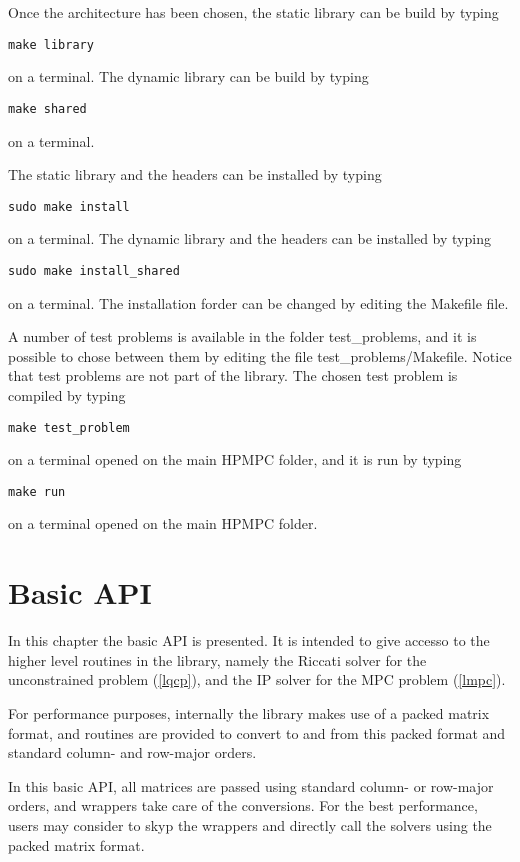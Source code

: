 \documentclass[a4paper]{report}
\begin{document}
Once the architecture has been chosen, the static library can be build by typing
\begin{verbatim}
make library
\end{verbatim}
on a terminal. The dynamic library can be build by typing
\begin{verbatim}
make shared
\end{verbatim}
on a terminal.

The static library and the headers can be installed by typing
\begin{verbatim}
sudo make install
\end{verbatim}
on a terminal. The dynamic library and the headers can be installed by typing
\begin{verbatim}
sudo make install_shared
\end{verbatim}
on a terminal. The installation forder can be changed by editing the Makefile file.

A number of test problems is available in the folder test\_problems, and it is possible to chose between them by editing the file test\_problems/Makefile.
Notice that test problems are not part of the library.
The chosen test problem is compiled by typing
\begin{verbatim}
make test_problem
\end{verbatim}
on a terminal opened on the main HPMPC folder, and it is run by typing
\begin{verbatim}
make run 
\end{verbatim}
on a terminal opened on the main HPMPC folder.


\chapter{Basic API}

In this chapter the basic API is presented. 
It is intended to give accesso to the higher level routines in the library, namely the Riccati solver for the unconstrained problem (\ref{lqcp}), and the IP solver for the MPC problem (\ref{lmpc}).

For performance purposes, internally the library makes use of a packed matrix format, and routines are provided to convert to and from this packed format and standard column- and row-major orders.

In this basic API, all matrices are passed using standard column- or row-major orders, and wrappers take care of the conversions.
For the best performance, users may consider to skyp the wrappers and directly call the solvers using the packed matrix format.
\end{document}

